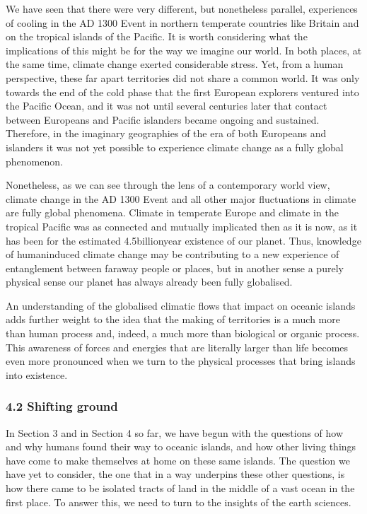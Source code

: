 \documentclass[letterpaper,10pt,english]{sphinxmanual}
\begin{document}
We have seen that there were very different, but nonetheless parallel, experiences of cooling in the AD 1300 Event in northern temperate countries like Britain and on the tropical islands of the Pacific. It is worth considering what the implications of this might be for the way we imagine our world. In both places, at the same time, climate change exerted considerable stress. Yet, from a human perspective, these far apart territories did not share a common world. It was only towards the end of
the cold phase that the first European explorers ventured into the Pacific Ocean, and it was not until several centuries later that contact between Europeans and Pacific islanders became ongoing and sustained. Therefore, in the imaginary geographies of the era \textendash{} of both Europeans and islanders \textendash{} it was not yet possible to experience climate change as a fully global phenomenon.

Nonetheless, as we can see through the lens of a contemporary world view, climate change in the AD 1300 Event and all other major fluctuations in climate are fully global phenomena. Climate in temperate Europe and climate in the tropical Pacific was as connected and mutually implicated then as it is now, as it has been for the estimated 4.5\sphinxhyphen{}billion\sphinxhyphen{}year existence of our planet. Thus, knowledge of human\sphinxhyphen{}induced climate change may be contributing to a new experience of entanglement between faraway
people or places, but in another sense \textendash{} a purely physical sense \textendash{} our planet has always already been fully globalised.

An understanding of the globalised climatic flows that impact on oceanic islands adds further weight to the idea that the making of territories is a much more than human process and, indeed, a much more than biological or organic process. This awareness of forces and energies that are literally larger than life becomes even more pronounced when we turn to the physical processes that bring islands into existence.


\subsubsection{4.2 Shifting ground}
\label{\detokenize{content/session_00/Part_00_04:4.2-Shifting-ground}}
In Section 3 and in Section 4 so far, we have begun with the questions of how and why humans found their way to oceanic islands, and how other living things have come to make themselves at home on these same islands. The question we have yet to consider, the one that in a way underpins these other questions, is how there came to be isolated tracts of land in the middle of a vast ocean in the first place. To answer this, we need to turn to the insights of the earth sciences.
\end{document}
